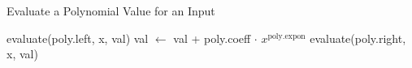 \begin{algorithm}[H]
    \caption{Evaluate a Polynomial Value for an Input} \label{evaluate}
    \begin{algorithmic}
            \State evaluate(poly.left, x, val)
            \State val $\gets$ val + poly.coeff $\cdot$ $x ^ \text{poly.expon}$
            \State evaluate(poly.right, x, val)
        \EndIf
    
    \EndProcedure
\end{algorithmic}

\end{algorithm}
